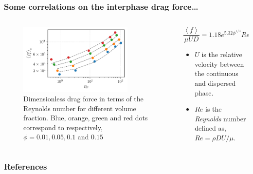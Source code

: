 \documentclass{sintefbeamer}
\newcommand{\avg}[1]{\left<#1\right>}
\begin{document}
\begin{frame}
  \frametitle{Some correlations on the interphase drag force\ldots}
\begin{columns}
  \begin{column}{0.5\textwidth}
    \begin{figure}
      \includegraphics*[width=0.8\textwidth]{image/HOMOGENEOUS/fCA/FH_mu_Re.pdf}
      \caption{Dimensionless drag force in terms of the Reynolds number for different volume fraction.
      Blue, orange, green and red dots correspond to respectively,  $\phi = 0.01, 0.05, 0.1$ and $0.15$}
    \end{figure}
  \end{column}
  \begin{column}{0.5\textwidth}
    \begin{equation*}
      \frac{\avg{f}}{\mu UD} 
      = 1.18 e^{5.32\phi^{1/3}}  Re^{0.33}  + Re^{0.87} +24.12
    \end{equation*}
    \begin{itemize}
      \item $U$ is the relative velocity between the continuous and dispersed phase.
      \item $Re$ is the \textit{Reynolds} number defined as, $Re = \rho D U / \mu$. 
    \end{itemize}
  \end{column}
\end{columns}
\end{frame}


\begin{frame}[t]
  \frametitle{References}
  
\end{frame}
\end{document}
